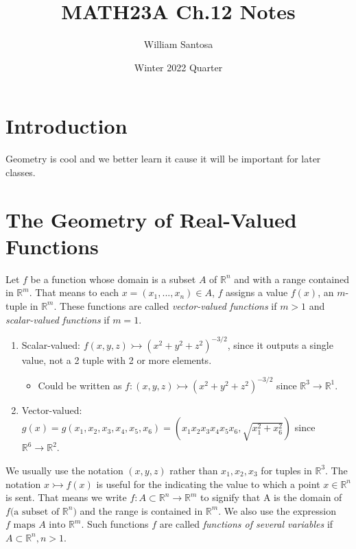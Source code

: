 \documentclass[12pt, letterpaper]{article}
\title{\vspace{-0.4cm}MATH23A Ch.12 Notes}
\author{\vspace{-0.4cm}William Santosa}
\date{\vspace{-0.4cm}Winter 2022 Quarter}
\begin{document}
\maketitle

\section{Introduction}

Geometry is cool and we better learn it cause it will be important for later classes.

\section{The Geometry of Real-Valued Functions}

Let \(f\) be a function whose domain is a subset \(A\) of \(\mathbb{R}^n\) and with a range contained in \(\mathbb{R}^m\). That means to each \(x = (x_1, ..., x_n) \in A\), \(f\) assigns a value \(f(x)\), an \(m\)-tuple in \(\mathbb{R}^m\). These functions are called \textit{vector-valued functions} if \(m > 1\) and \textit{scalar-valued functions} if \(m = 1\). 
\begin{enumerate}
    \item Scalar-valued: \(f(x, y, z) \rightarrowtail (x^2 + y^2 + z^2)^{-3/2}\), since it outputs a single value, not a 2 tuple with 2 or more elements.
    \begin{itemize}
        \item Could be written as \(f: (x, y, z) \rightarrowtail (x^2+y^2+z^2)^{-3/2}\) since \(\mathbb{R}^3 \rightarrow \mathbb{R}^1\).
    \end{itemize}
    \item Vector-valued: \(g(x) = g(x_1, x_2, x_3, x_4, x_5, x_6) = (x_1x_2x_3x_4x_5x_6, \sqrt{x_1^2+x_6^2})\) since \(\mathbb{R}^6 \rightarrow \mathbb{R}^2\).
\end{enumerate}

We usually use the notation \((x,y,z)\) rather than \(x_1,x_2,x_3\) for tuples in \(\mathbb{R}^3\).
The notation \(x \rightarrowtail f(x)\) is useful for the indicating the value to which a point \(x \in \mathbb{R}^n\) is sent. That means we write \(f: A \subset \mathbb{R}^n \rightarrow \mathbb{R}^m\) to signify that A is the domain of \(f\text{(a subset of }\mathbb{R}^n)\) and the range is contained in \(\mathbb{R}^m\). We also use the expression \(f \text{ maps } A \text{ into } \mathbb{R}^m\). Such functions \(f\) are called \textit{functions of several variables} if \(A \subset \mathbb{R}^n,n>1\).
\end{document}
